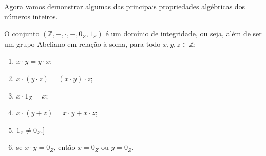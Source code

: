 Agora vamos demonstrar algumas das principais propriedades algébricas dos números inteiros.
\begin{proposition}
    O conjunto $(\mathbb Z, +, \cdot, -, 0_Z, 1_Z)$ é um domínio de integridade, ou seja, além de ser um grupo Abeliano em relação à soma, para todo $x, y, z \in \mathbb Z$:
    \begin{enumerate}[label=(\alph*)]
        \item $x\cdot y=y\cdot x$;
        \item $x\cdot (y\cdot z)=(x\cdot y)\cdot z$;
        \item $x\cdot 1_Z=x$;
        \item $x\cdot (y+z)=x\cdot y+x\cdot z$;
        \item $1_Z\neq 0_Z$.]
        \item se $x\cdot y=0_Z$, então $x=0_Z$ ou $y=0_Z$.
    \end{enumerate}
\end{proposition}
